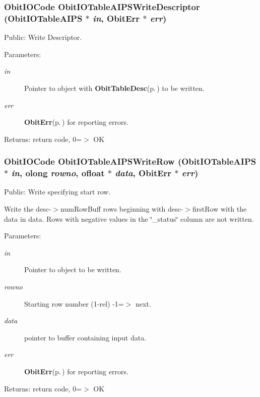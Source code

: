 \subsubsection{\setlength{\rightskip}{0pt plus 5cm}Obit\-IOCode Obit\-IOTable\-AIPSWrite\-Descriptor ({\bf Obit\-IOTable\-AIPS} $\ast$ {\em in}, {\bf Obit\-Err} $\ast$ {\em err})}\label{ObitIOTableAIPS_8c_a24}


Public: Write Descriptor. 

\begin{Desc}
\item[Parameters:]
\begin{description}
\item[{\em in}]Pointer to object with {\bf Obit\-Table\-Desc}{\rm (p.\,\pageref{structObitTableDesc})} to be written. \item[{\em err}]{\bf Obit\-Err}{\rm (p.\,\pageref{structObitErr})} for reporting errors. \end{description}
\end{Desc}
\begin{Desc}
\item[Returns:]return code, 0=$>$ OK \end{Desc}
\subsubsection{\setlength{\rightskip}{0pt plus 5cm}Obit\-IOCode Obit\-IOTable\-AIPSWrite\-Row ({\bf Obit\-IOTable\-AIPS} $\ast$ {\em in}, {\bf olong} {\em rowno}, {\bf ofloat} $\ast$ {\em data}, {\bf Obit\-Err} $\ast$ {\em err})}\label{ObitIOTableAIPS_8c_a21}


Public: Write specifying start row. 

Write the desc-$>$num\-Row\-Buff rows beginning with desc-$>$first\-Row with the data in data. Rows with negative values in the \char`\"{}\_\-status\char`\"{} column are not written. \begin{Desc}
\item[Parameters:]
\begin{description}
\item[{\em in}]Pointer to object to be written. \item[{\em rowno}]Starting row number (1-rel) -1=$>$ next. \item[{\em data}]pointer to buffer containing input data. \item[{\em err}]{\bf Obit\-Err}{\rm (p.\,\pageref{structObitErr})} for reporting errors. \end{description}
\end{Desc}
\begin{Desc}
\item[Returns:]return code, 0=$>$ OK \end{Desc}
